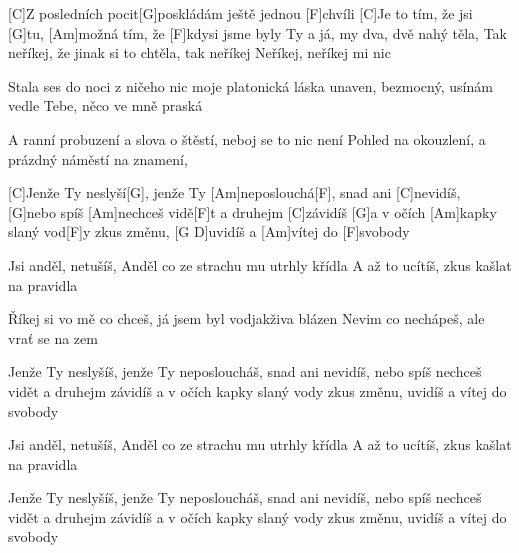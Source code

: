 
[C]Z posledních pocit[G]poskládám ještě jednou [F] chvíli
[C]Je to tím, že jsi [G]tu,
[Am]možná tím, že [F]kdysi jsme byly Ty a 
já, my dva, dvě nahý těla,
Tak neříkej, že jinak si to chtěla,
tak neříkej
Neříkej, neříkej mi nic

Stala ses do noci
z ničeho nic moje platonická láska
unaven, bezmocný,
usínám vedle Tebe, něco ve mně praská

A ranní probuzení
a slova o štěstí, neboj se to nic není
Pohled na okouzlení,
a prázdný náměstí na znamení,

[C]Jenže Ty neslyší[G],
jenže Ty [Am]neposlouchá[F],
snad ani [C]nevidíš,
[G]nebo spíš [Am]nechceš vidě[F]t
a druhejm [C]závidíš
[G]a v očích [Am]kapky slaný vod[F]y
zkus změnu, [G D]uvidíš 
a [Am]vítej do [F]svobody

Jsi anděl, netušíš,
Anděl co ze strachu mu utrhly křídla
A až to ucítíš, zkus kašlat na pravidla

Říkej si vo mě co chceš,
já jsem byl vodjakživa blázen
Nevim co nechápeš,
ale vrať se na zem

Jenže Ty neslyšíš,
jenže Ty neposloucháš,
snad ani nevidíš,
nebo spíš nechceš vidět
a druhejm závidíš
a v očích kapky slaný vody
zkus změnu, uvidíš
a vítej do svobody

Jsi anděl, netušíš,
Anděl co ze strachu mu utrhly křídla
A až to ucítíš, zkus kašlat na pravidla

Jenže Ty neslyšíš,
jenže Ty neposloucháš,
snad ani nevidíš,
nebo spíš nechceš vidět
a druhejm závidíš
a v očích kapky slaný vody
zkus změnu, uvidíš
a vítej do svobody



